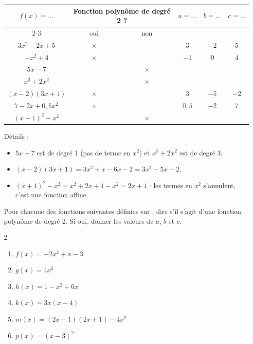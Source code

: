 \documentclass[11pt,a4paper]{book}
\begin{document}
\smallskip
\begin{corrBox}
	\begin{center}
		\setlength{\extrarowheight}{3pt}
		\setlength{\tabcolsep}{0.3cm}
		\begin{tabular}{|c|c|c|c|c|c|}
			\hline
			\multirow{2}{*}{$f(x)=\ldots$} & \multicolumn{2}{c|}{Fonction polynôme de degré 2 ?} & \multirow{2}{*}{$a=\ldots$} & \multirow{2}{*}{$b=\ldots$} & \multirow{2}{*}{$c=\ldots$} \\
			\cline{2-3}
			& oui & non & & & \\
			\hline $3x^2-2x+5$ & $\times$ & & $3$ & $-2$ & $5$ \\
			\hline $-x^2+4$ & $\times$ & & $-1$ & $0$ & $4$ \\
			\hline $5x-7$ & & $\times$ & & & \\
			\hline $x^3+2x^2$ & & $\times$ & & & \\
			\hline $(x-2)(3x+1)$ & $\times$ & & $3$ & $-5$ & $-2$ \\
			\hline $7-2x+0,5x^2$ & $\times$ & & $0,5$ & $-2$ & $7$ \\
			\hline $(x+1)^2-x^2$ & & $\times$ & & & \\
			\hline
		\end{tabular}
	\end{center}
	Détails :
	\begin{itemize}
		\item $5x-7$ est de degré 1 (pas de terme en $x^2$) et $x^3+2x^2$ est de degré 3.
		\item $(x-2)(3x+1)=3x^2+x-6x-2=3x^2-5x-2$.
		\item $(x+1)^2-x^2=x^2+2x+1-x^2=2x+1$ : les termes en $x^2$ s'annulent, c'est une fonction affine.
	\end{itemize}
\end{corrBox}

\exerciceDS{}

Pour chacune des fonctions suivantes définies sur \R, dire s'il s'agit d'une fonction polynôme de degré 2. Si oui, donner les valeurs de $a$, $b$ et $c$.

\begin{multicols}{2}
	\begin{enumerate}[label=\textbf{\alph*)}]
		\item $f(x)=-2x^2+x-3$
		\item $g(x)=4x^2$
		\item $h(x)=1-x^2+6x$
		\item $k(x)=3x(x-4)$
		\item $m(x)=(2x-1)(2x+1)-4x^2$
		\item $p(x)=(x-3)^2$
	\end{enumerate}
\end{multicols}
\end{document}
